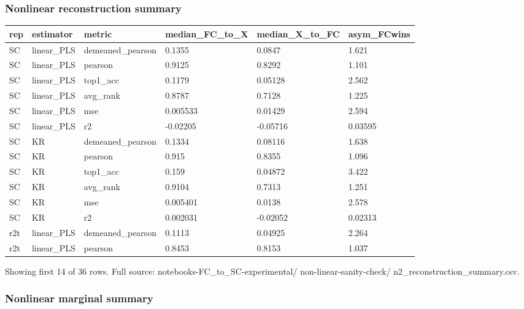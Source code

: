 \subsubsection{Nonlinear reconstruction summary}\label{nonlinear-reconstruction-summary}

{\def\LTcaptype{none} %
\begin{longtable}[]{@{}llllll@{}}
\toprule\noalign{}
rep & estimator & metric & median\_FC\_to\_X & median\_X\_to\_FC & asym\_FCwins \\
\midrule\noalign{}
\endhead
\bottomrule\noalign{}
\endlastfoot
SC & linear\_PLS & demeaned\_pearson & 0.1355 & 0.0847 & 1.621 \\
SC & linear\_PLS & pearson & 0.9125 & 0.8292 & 1.101 \\
SC & linear\_PLS & top1\_acc & 0.1179 & 0.05128 & 2.562 \\
SC & linear\_PLS & avg\_rank & 0.8787 & 0.7128 & 1.225 \\
SC & linear\_PLS & mse & 0.005533 & 0.01429 & 2.594 \\
SC & linear\_PLS & r2 & -0.02205 & -0.05716 & 0.03595 \\
SC & KR & demeaned\_pearson & 0.1334 & 0.08116 & 1.638 \\
SC & KR & pearson & 0.915 & 0.8355 & 1.096 \\
SC & KR & top1\_acc & 0.159 & 0.04872 & 3.422 \\
SC & KR & avg\_rank & 0.9104 & 0.7313 & 1.251 \\
SC & KR & mse & 0.005401 & 0.0138 & 2.578 \\
SC & KR & r2 & 0.002031 & -0.02052 & 0.02313 \\
r2t & linear\_PLS & demeaned\_pearson & 0.1113 & 0.04925 & 2.264 \\
r2t & linear\_PLS & pearson & 0.8453 & 0.8153 & 1.037 \\
\end{longtable}
}

Showing first 14 of 36 rows. Full source: notebooks-FC\_to\_SC-experimental/ non-linear-sanity-check/ n2\_reconstruction\_summary.csv.

\subsubsection{Nonlinear marginal summary}\label{nonlinear-marginal-summary}

